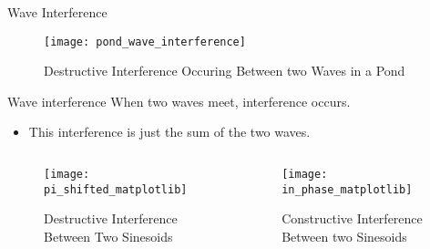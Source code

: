 \documentclass[aspectratio=169]{beamer}
\begin{document}
\begin{frame}{Wave Interference}
	\begin{figure}
		\texttt{[image: pond\_wave\_interference]}
												
		\caption {Destructive Interference Occuring Between two Waves in a Pond}
	\end{figure}				
\end{frame}

\begin{frame}{Wave interference}
	When two waves meet, interference occurs.
	\begin{itemize}
		\item This interference is just the sum of the two waves.
	\end{itemize}
							
								
	\begin{columns}[c]	
		\begin{column}{.5\textwidth}
			\begin{figure}
				\texttt{[image: pi\_shifted\_matplotlib]}
				\caption{Destructive Interference Between Two Sinesoids}
			\end{figure}
		\end{column}
											
										
											
		\begin{column}{.5\textwidth}
			\begin{figure}
				\texttt{[image: in\_phase\_matplotlib]}
				\caption{Constructive Interference Between two Sinesoids}
			\end{figure}
		\end{column}
	\end{columns}
							
\end{frame}
\end{document}
